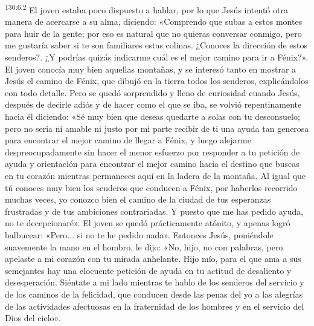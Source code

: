 \par 
\textsuperscript{130:6.2} El joven estaba poco dispuesto a hablar, por lo que Jesús intentó otra manera de acercarse a su alma, diciendo: «Comprendo que subas a estos montes para huir de la gente; por eso es natural que no quieras conversar conmigo, pero me gustaría saber si te son familiares estas colinas. ¿Conoces la dirección de estos senderos?. ¿Y podrías quizás indicarme cuál es el mejor camino para ir a Fénix?». El joven conocía muy bien aquellas montañas, y se interesó tanto en mostrar a Jesús el camino de Fénix, que dibujó en la tierra todos los senderos, explicándolos con todo detalle. Pero se quedó sorprendido y lleno de curiosidad cuando Jesús, después de decirle adiós y de hacer como el que se iba, se volvió repentinamente hacia él diciendo: «Sé muy bien que deseas quedarte a solas con tu desconsuelo; pero no sería ni amable ni justo por mi parte recibir de ti una ayuda tan generosa para encontrar el mejor camino de llegar a Fénix, y luego alejarme despreocupadamente sin hacer el menor esfuerzo por responder a tu petición de ayuda y orientación para encontrar el mejor camino hacia el destino que buscas en tu corazón mientras permaneces aquí en la ladera de la montaña. Al igual que tú conoces muy bien los senderos que conducen a Fénix, por haberlos recorrido muchas veces, yo conozco bien el camino de la ciudad de tus esperanzas frustradas y de tus ambiciones contrariadas. Y puesto que me has pedido ayuda, no te decepcionaré». El joven se quedó prácticamente atónito, y apenas logró balbucear: «Pero... si no te he pedido nada». Entonces Jesús, poniéndole suavemente la mano en el hombro, le dijo: «No, hijo, no con palabras, pero apelaste a mi corazón con tu mirada anhelante. Hijo mío, para el que ama a sus semejantes hay una elocuente petición de ayuda en tu actitud de desaliento y desesperación. Siéntate a mi lado mientras te hablo de los senderos del servicio y de los caminos de la felicidad, que conducen desde las penas del yo a las alegrías de las actividades afectuosas en la fraternidad de los hombres y en el servicio del Dios del cielo».


